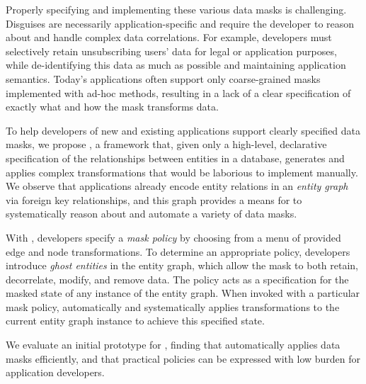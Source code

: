 Properly specifying and implementing these various data masks is challenging. Disguises are necessarily
application-specific and require the developer to reason about and handle complex data correlations.
For example, developers must selectively retain unsubscribing users' data for legal or application
purposes, while de-identifying this data as much as possible and maintaining application semantics.
Today's applications often support only coarse-grained masks implemented with ad-hoc methods,
resulting in a lack of a clear specification of exactly what and how the mask transforms data.

To help developers of new and existing applications support clearly specified data masks, we propose
\sys, a framework that, given only a high-level, declarative specification of the relationships
between entities in a database, generates and applies complex transformations that would be
laborious to implement manually. We observe that applications already encode entity
relations in an \emph{entity graph} via foreign key relationships, and this graph provides a means
for \sys to systematically reason about and automate a variety of data masks.

With \sys, developers specify a \emph{mask policy} by choosing from a menu of provided edge and node
transformations. To determine an appropriate policy, developers introduce \emph{ghost entities} in the entity graph, which allow the mask to both retain, decorrelate, modify,
and remove data. The policy acts as a specification for the masked state of any instance of the
entity graph. When invoked with a particular mask policy, \sys automatically and systematically
applies transformations to the current entity graph instance to achieve this specified state.

We evaluate an initial prototype for \sys, finding that \sys automatically applies
data masks efficiently, and that practical policies can be expressed with low burden for application
developers.
\fi

